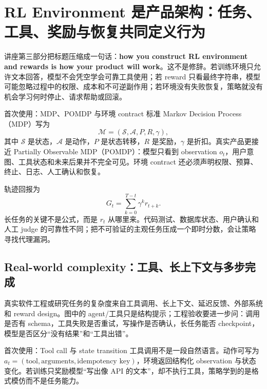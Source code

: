 \section{RL Environment 是产品架构：任务、工具、奖励与恢复共同定义行为}

讲座第三部分把标题压缩成一句话：\textbf{how you construct RL environment and rewards is how your product will work}。这不是修辞。若训练环境只允许文本回答，模型不会凭空学会可靠工具使用；若 reward 只看最终字符串，模型可能忽略过程中的权限、成本和不可逆副作用；若环境没有失败恢复，策略就没有机会学习何时停止、请求帮助或回滚。


\begin{importantbox}{首次使用：MDP、POMDP 与环境 contract}
标准 Markov Decision Process（MDP）写为
\[
\mathcal{M}=(\mathcal{S},\mathcal{A},P,R,\gamma),
\]
其中 $\mathcal{S}$ 是状态，$\mathcal{A}$ 是动作，$P$ 是状态转移，$R$ 是奖励，$\gamma$ 是折扣。真实产品更接近 Partially Observable MDP（POMDP）：模型只看到 observation $o_t$，用户意图、工具状态和未来后果并不完全可见。环境 contract 还必须声明权限、预算、终止、日志、人工确认和恢复。
\end{importantbox}

轨迹回报为
\[
G_t=\sum_{k=0}^{T-t}\gamma^k r_{t+k}.
\]
长任务的关键不是公式，而是 $r_t$ 从哪里来。代码测试、数据库状态、用户确认和人工 judge 的可靠性不同；把不可验证的主观任务压成一个即时分数，会让策略寻找代理漏洞。

\subsection{Real-world complexity：工具、长上下文与多步完成}

真实软件工程或研究任务的复杂度来自工具调用、长上下文、延迟反馈、外部系统和 reward design。图中的 agent/工具只是结构提示；工程验收要进一步问：调用是否有 schema，工具失败是否重试，写操作是否确认，长任务能否 checkpoint，模型是否区分“没有结果”和“工具出错”。


\begin{knowledgebox}{首次使用：Tool call 与 state transition}
工具调用不是一段自然语言。动作可写为 $a_t=(\text{tool},\text{arguments},\text{idempotency key})$，环境返回结构化 observation 与状态变化。若训练只奖励模型“写出像 API 的文本”，却不执行工具，策略学到的是格式模仿而不是任务能力。
\end{knowledgebox}

